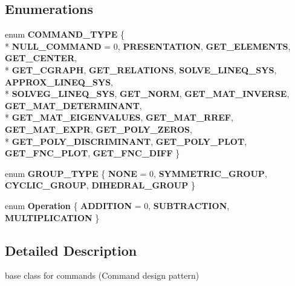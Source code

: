 \subsection*{Enumerations}
\begin{DoxyCompactItemize}
\item 
enum {\bfseries C\-O\-M\-M\-A\-N\-D\-\_\-\-T\-Y\-P\-E} \{ \\*
{\bfseries N\-U\-L\-L\-\_\-\-C\-O\-M\-M\-A\-N\-D} = 0, 
{\bfseries P\-R\-E\-S\-E\-N\-T\-A\-T\-I\-O\-N}, 
{\bfseries G\-E\-T\-\_\-\-E\-L\-E\-M\-E\-N\-T\-S}, 
{\bfseries G\-E\-T\-\_\-\-C\-E\-N\-T\-E\-R}, 
\\*
{\bfseries G\-E\-T\-\_\-\-C\-G\-R\-A\-P\-H}, 
{\bfseries G\-E\-T\-\_\-\-R\-E\-L\-A\-T\-I\-O\-N\-S}, 
{\bfseries S\-O\-L\-V\-E\-\_\-\-L\-I\-N\-E\-Q\-\_\-\-S\-Y\-S}, 
{\bfseries A\-P\-P\-R\-O\-X\-\_\-\-L\-I\-N\-E\-Q\-\_\-\-S\-Y\-S}, 
\\*
{\bfseries S\-O\-L\-V\-E\-G\-\_\-\-L\-I\-N\-E\-Q\-\_\-\-S\-Y\-S}, 
{\bfseries G\-E\-T\-\_\-\-N\-O\-R\-M}, 
{\bfseries G\-E\-T\-\_\-\-M\-A\-T\-\_\-\-I\-N\-V\-E\-R\-S\-E}, 
{\bfseries G\-E\-T\-\_\-\-M\-A\-T\-\_\-\-D\-E\-T\-E\-R\-M\-I\-N\-A\-N\-T}, 
\\*
{\bfseries G\-E\-T\-\_\-\-M\-A\-T\-\_\-\-E\-I\-G\-E\-N\-V\-A\-L\-U\-E\-S}, 
{\bfseries G\-E\-T\-\_\-\-M\-A\-T\-\_\-\-R\-R\-E\-F}, 
{\bfseries G\-E\-T\-\_\-\-M\-A\-T\-\_\-\-E\-X\-P\-R}, 
{\bfseries G\-E\-T\-\_\-\-P\-O\-L\-Y\-\_\-\-Z\-E\-R\-O\-S}, 
\\*
{\bfseries G\-E\-T\-\_\-\-P\-O\-L\-Y\-\_\-\-D\-I\-S\-C\-R\-I\-M\-I\-N\-A\-N\-T}, 
{\bfseries G\-E\-T\-\_\-\-P\-O\-L\-Y\-\_\-\-P\-L\-O\-T}, 
{\bfseries G\-E\-T\-\_\-\-F\-N\-C\-\_\-\-P\-L\-O\-T}, 
{\bfseries G\-E\-T\-\_\-\-F\-N\-C\-\_\-\-D\-I\-F\-F}
 \}
\item 
enum {\bfseries G\-R\-O\-U\-P\-\_\-\-T\-Y\-P\-E} \{ {\bfseries N\-O\-N\-E} = 0, 
{\bfseries S\-Y\-M\-M\-E\-T\-R\-I\-C\-\_\-\-G\-R\-O\-U\-P}, 
{\bfseries C\-Y\-C\-L\-I\-C\-\_\-\-G\-R\-O\-U\-P}, 
{\bfseries D\-I\-H\-E\-D\-R\-A\-L\-\_\-\-G\-R\-O\-U\-P}
 \}
\item 
enum {\bfseries Operation} \{ {\bfseries A\-D\-D\-I\-T\-I\-O\-N} = 0, 
{\bfseries S\-U\-B\-T\-R\-A\-C\-T\-I\-O\-N}, 
{\bfseries M\-U\-L\-T\-I\-P\-L\-I\-C\-A\-T\-I\-O\-N}
 \}
\end{DoxyCompactItemize}


\subsection{Detailed Description}
base class for commands (Command design pattern) 